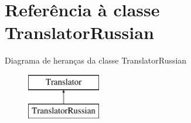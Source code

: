 \hypertarget{class_translator_russian}{\section{Referência à classe Translator\-Russian}
\label{class_translator_russian}
}
Diagrama de heranças da classe Translator\-Russian\begin{figure}[H]
\begin{center}
\leavevmode
\includegraphics[height=2.000000cm]{class_translator_russian}
\end{center}
\end{figure}
